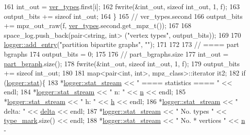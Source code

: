 \begin{DoxyCode}
161     int\_out = \hyperlink{classmarked__graph__compressed_af446cc5e23c241a92b76642fd5ebc403}{ver\_types}.first[i];
162     fwrite(&int\_out, \textcolor{keyword}{sizeof} int\_out, 1, f);
163     output\_bits += \textcolor{keyword}{sizeof} int\_out;
164   \}
165   \textcolor{comment}{// ver\_types.second}
166   output\_bits += mpz\_out\_raw(f, \hyperlink{classmarked__graph__compressed_af446cc5e23c241a92b76642fd5ebc403}{ver\_types}.second.get\_mpz\_t());
167 
168   space\_log.push\_back(pair<string, int> (\textcolor{stringliteral}{"vertex types"}, output\_bits));
169 
170   \hyperlink{classlogger_a710163deb17bc81f70d53d285b8ac9ac}{logger::add\_entry}(\textcolor{stringliteral}{"partition bipartite graphs"}, \textcolor{stringliteral}{""});
171   
172 
173   \textcolor{comment}{// ==== part bgraphs}
174   output\_bits = 0;
175 
176   \textcolor{comment}{// part\_bgraphs.size}
177   int\_out = \hyperlink{classmarked__graph__compressed_a7b3267063fba30b45eb21b3ba4e07536}{part\_bgraph}.size();
178   fwrite(&int\_out, \textcolor{keyword}{sizeof} int\_out, 1, f);
179   output\_bits += \textcolor{keyword}{sizeof} int\_out;
180 
181   map<pair<int, int>, mpz\_class>::iterator it2;
182   \textcolor{keywordflow}{if} (\hyperlink{classlogger_a26812b5ba03f130e8dae3446d5fc032f}{logger::stat})\{
183     *\hyperlink{classlogger_a7db37821f875f2ba3540980b355779f5}{logger::stat\_stream} << \textcolor{stringliteral}{" ==== statistics ==== "} << endl;
184     *\hyperlink{classlogger_a7db37821f875f2ba3540980b355779f5}{logger::stat\_stream} << \textcolor{stringliteral}{" n:                "} << \hyperlink{classmarked__graph__compressed_a8d841016ddb11cfd33748c8deb6277ba}{n} << endl;
185     *\hyperlink{classlogger_a7db37821f875f2ba3540980b355779f5}{logger::stat\_stream} << \textcolor{stringliteral}{" h:                "} << \hyperlink{classmarked__graph__compressed_af6ff623407b673d08d0cab77b39c2193}{h} << endl;
186     *\hyperlink{classlogger_a7db37821f875f2ba3540980b355779f5}{logger::stat\_stream} << \textcolor{stringliteral}{" delta:            "} << \hyperlink{classmarked__graph__compressed_a8b2aaac68e9332ddc78d88eb60b323a7}{delta} << endl;
187     *\hyperlink{classlogger_a7db37821f875f2ba3540980b355779f5}{logger::stat\_stream} << \textcolor{stringliteral}{" No. types         "} << 
      \hyperlink{classmarked__graph__compressed_a86b00223525703e973415cbc9c94da68}{type\_mark}.size() << endl;
188     *\hyperlink{classlogger_a7db37821f875f2ba3540980b355779f5}{logger::stat\_stream} << \textcolor{stringliteral}{" No. * vertices    "} << \hyperlink{classmarked__graph__compressed_a8d841016ddb11cfd33748c8deb6277ba}{n} - 

\end{DoxyCode}

